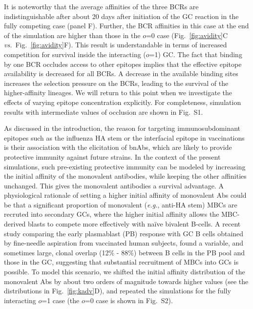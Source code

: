 \documentclass[utf8]{frontiersHLTH}%
\newcommand{\cred}[1]{\textsf{\color{red}#1}}
\def\eg {{\it e.g.}}
\def\vs {{\it vs.}}
\newcommand{\fig}[1]{Fig.~\ref{fig:#1}}
\newcommand{\occl}{o}
\begin{document}
It is noteworthy that the average affinities of the three BCRs are
indistinguishable after about 20 days after initiation of the GC reaction
in the fully competing case (panel F). Further, the BCR affinities in this
case at the end of the
simulation are higher than those in the $\occl$=0 case (\fig{avidity}C
\vs~\fig{avidity}F). This result is understandable in terms of increased
competition for survival inside the interacting ($\occl$=1) GC.  The fact
that binding by one BCR occludes access to other epitopes implies that
the effective epitope availability is decreased for all BCRs. 
A decrease in the available binding sites increases the
selection pressure on the BCRs, leading to the survival of the higher-affinity
lineages. We will return to this point when we investigate
the effects of varying epitope concentration explicitly. 
For completeness, simulation
results with intermediate values of occlusion are shown in Fig.~S1.

As discussed in the introduction, the reason for targeting immunosubdominant
epitopes such as the influenza HA stem or the interfacial
epitope\cite{watanabe19} in vaccinations is their association with the elicitation of bnAbs, which
are likely to provide protective immunity against future strains.
In the context of the present simulations,
such pre-existing protective immunity
can be modeled by increasing the initial affinity of the monovalent
antibodies, while keeping the other affinities unchanged.  This gives the
monovalent antibodies a survival advantage. A physiological
rationale of setting a higher initial affinity of monovalent Abs could
be that a significant proportion of monovalent (\eg, anti-HA stem) MBCs are recruted into secondary
GCs, where the higher initial affinity allows the MBC-derived blasts to compete more effectively with na\"ive bivalent B-cells.
%
\cred{A recent study comparing the early plasmablast (PB) response with GC
B cells obtained by fine-needle aspiration from vaccinated human subjects, found a variable, and sometimes large, clonal overlap
(12\% - 88\%) between B cells in the PB pool and those in the GC, suggesting that substantial 
recruitment of MBCs into GCs is possible.\cite{turner20}}
%
To model this scenario, we shifted the initial affinity distribution of the
monovalent Abs
by about two orders of magnitude towards higher values
(see the distributions in \fig{kadv}D), and repeated the simulations for the
fully interacting $\occl$=1 case (the $\occl$=0 case is shown in Fig.~S2).
\end{document}
